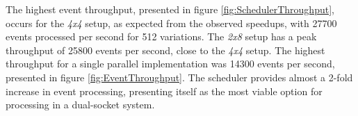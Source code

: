 The highest event throughput, presented in figure \ref{fig:SchedulerThroughput}, occurs for the \textit{4x4} setup, as expected from the observed speedups, with 27700 events processed per second for 512 variations. The \textit{2x8} setup has a peak throughput of 25800 events per second, close to the \textit{4x4} setup. The highest throughput for a single parallel implementation was 14300 events per second, presented in figure \ref{fig:EventThroughput}. The scheduler provides almost a 2-fold increase in event processing, presenting itself as the most viable option for processing in a dual-socket system.
